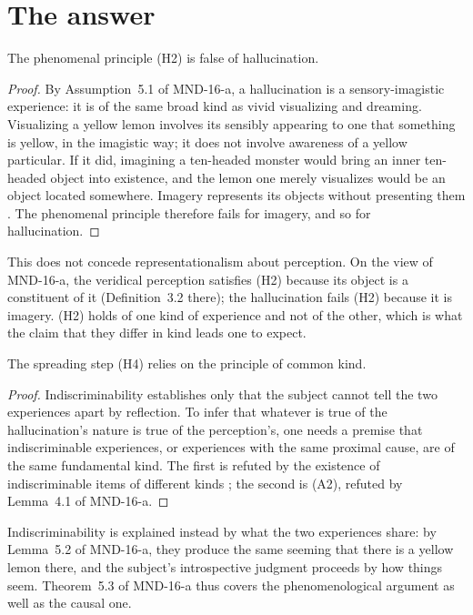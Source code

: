 \documentclass{situationist-preprint}
\begin{document}
\section{The answer}

\begin{proposition}\label{p:h2}
The phenomenal principle (H2) is false of hallucination.
\end{proposition}

\begin{proof}
By Assumption~5.1 of MND-16-a, a hallucination is a sensory-imagistic experience: it is of the same broad kind as vivid visualizing and dreaming. Visualizing a yellow lemon involves its sensibly appearing to one that something is yellow, in the imagistic way; it does not involve awareness of a yellow particular. If it did, imagining a ten-headed monster would bring an inner ten-headed object into existence, and the lemon one merely visualizes would be an object located somewhere. Imagery represents its objects without presenting them \citep{Martin2002}. The phenomenal principle therefore fails for imagery, and so for hallucination.
\end{proof}

This does not concede representationalism about perception. On the view of MND-16-a, the veridical perception satisfies (H2) because its object is a constituent of it (Definition~3.2 there); the hallucination fails (H2) because it is imagery. (H2) holds of one kind of experience and not of the other, which is what the claim that they differ in kind leads one to expect.

\begin{proposition}\label{p:h4}
The spreading step (H4) relies on the principle of common kind.
\end{proposition}

\begin{proof}
Indiscriminability establishes only that the subject cannot tell the two experiences apart by reflection. To infer that whatever is true of the hallucination's nature is true of the perception's, one needs a premise that indiscriminable experiences, or experiences with the same proximal cause, are of the same fundamental kind. The first is refuted by the existence of indiscriminable items of different kinds \citep{Williamson1990}; the second is (A2), refuted by Lemma~4.1 of MND-16-a.
\end{proof}

Indiscriminability is explained instead by what the two experiences share: by Lemma~5.2 of MND-16-a, they produce the same seeming that there is a yellow lemon there, and the subject's introspective judgment proceeds by how things seem. Theorem~5.3 of MND-16-a thus covers the phenomenological argument as well as the causal one.
\end{document}
